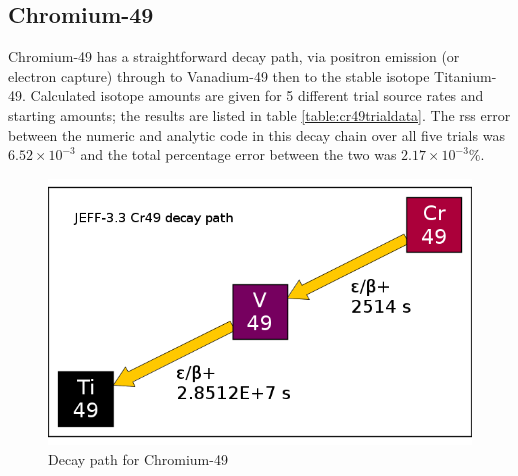 

\clearpage
\subsection{Chromium-49}
\FloatBarrier

Chromium-49 has a straightforward decay path, via positron emission (or electron capture) through to Vanadium-49 then to the stable isotope Titanium-49.  Calculated isotope amounts are given for 5 different trial source rates and starting amounts; the results are listed in table \ref{table:cr49trialdata}.  The \acrshort{rss} error between the numeric and analytic code in this decay chain over all five trials was $6.52 \times 10^{-3}$ and the total percentage error between the two was $2.17 \times 10^{-3}\%$.

\begin{figure}[!h]
\centering
\includegraphics[width=.4\linewidth]{appendix/activity_equation/decay_paths/24cr49_decay.png}
\caption{Decay path for Chromium-49 \cite{jeff311}}
\label{fig:decaycr49}
\end{figure}

\FloatBarrier


